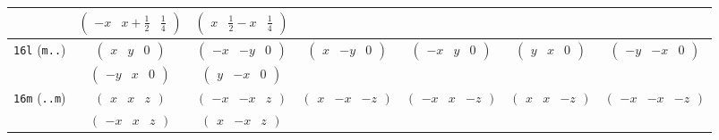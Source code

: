 \documentclass[fleqn,9pt,landscape]{jsarticle}
\begin{document}
\begin{center}
\begin{longtable}{ccccccc}
& $ \begin{pmatrix} - x & x + \frac{1}{2} & \frac{1}{4} \end{pmatrix} $ & $ \begin{pmatrix} x & \frac{1}{2} - x & \frac{1}{4} \end{pmatrix} $ & $  $ & $  $ & $  $ & $  $ \\ \hline
{\tt 16l} ({\tt m..}) & $ \begin{pmatrix} x & y & 0 \end{pmatrix} $ & $ \begin{pmatrix} - x & - y & 0 \end{pmatrix} $ & $ \begin{pmatrix} x & - y & 0 \end{pmatrix} $ & $ \begin{pmatrix} - x & y & 0 \end{pmatrix} $ & $ \begin{pmatrix} y & x & 0 \end{pmatrix} $ & $ \begin{pmatrix} - y & - x & 0 \end{pmatrix} $ \\
& $ \begin{pmatrix} - y & x & 0 \end{pmatrix} $ & $ \begin{pmatrix} y & - x & 0 \end{pmatrix} $ & $  $ & $  $ & $  $ & $  $ \\ \hline
{\tt 16m} ({\tt ..m}) & $ \begin{pmatrix} x & x & z \end{pmatrix} $ & $ \begin{pmatrix} - x & - x & z \end{pmatrix} $ & $ \begin{pmatrix} x & - x & - z \end{pmatrix} $ & $ \begin{pmatrix} - x & x & - z \end{pmatrix} $ & $ \begin{pmatrix} x & x & - z \end{pmatrix} $ & $ \begin{pmatrix} - x & - x & - z \end{pmatrix} $ \\
& $ \begin{pmatrix} - x & x & z \end{pmatrix} $ & $ \begin{pmatrix} x & - x & z \end{pmatrix} $ & $  $ & $  $ & $  $ & $  $ \\ \hline

\end{longtable}
\end{center}
\end{document}
